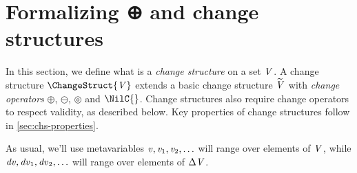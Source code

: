 

\section{Formalizing ⊕ and change structures}
\label{sec:change-structures-formal}
\label{sec:oplus}
In this section, we define what is a \emph{change structure} on a
set \ensuremath{\Conid{V}}. A change structure \ensuremath{\ChangeStruct{\Conid{V}}} extends a basic change structure
\ensuremath{\widetilde{\Conid{V}}} with
\emph{change operators} \ensuremath{\oplus }, \ensuremath{\ominus }, \ensuremath{\circledcirc } and
\ensuremath{\NilC{}}. Change structures also require change operators to
respect validity, as described below.
Key properties of change structures follow in
\cref{sec:chs-properties}.

As usual, we'll use metavariables \ensuremath{\Varid{v},\Varid{v}_{1},\Varid{v}_{2},\ldots} will range over elements of
\ensuremath{\Conid{V}}, while \ensuremath{\Varid{dv},\Varid{dv}_{1},\Varid{dv}_{2},\ldots} will range over elements of
\ensuremath{\Delta \Conid{V}}.


